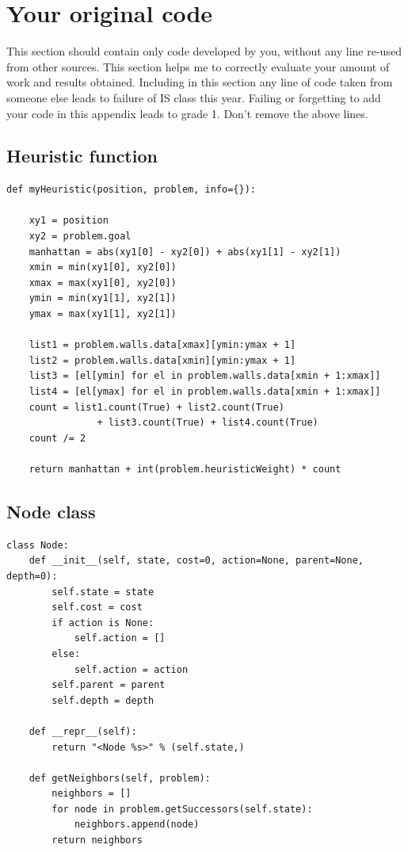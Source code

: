 \documentclass[a4paper,12pt]{report}
\begin{document}
\appendix

\chapter{Your original code}
\label{app:code}
This section should contain only code developed by you, without any line re-used from other sources. 
This section helps me to correctly evaluate your amount of work and results obtained. 
Including in this section any line of code taken from someone else leads to failure of IS class this year.
Failing or forgetting to add your code in this appendix leads to grade 1.
Don't remove the above lines.

\section{Heuristic function}

\begin{Verbatim}[frame=single]
def myHeuristic(position, problem, info={}):

    xy1 = position
    xy2 = problem.goal
    manhattan = abs(xy1[0] - xy2[0]) + abs(xy1[1] - xy2[1])
    xmin = min(xy1[0], xy2[0])
    xmax = max(xy1[0], xy2[0])
    ymin = min(xy1[1], xy2[1])
    ymax = max(xy1[1], xy2[1])

    list1 = problem.walls.data[xmax][ymin:ymax + 1]
    list2 = problem.walls.data[xmin][ymin:ymax + 1]
    list3 = [el[ymin] for el in problem.walls.data[xmin + 1:xmax]]
    list4 = [el[ymax] for el in problem.walls.data[xmin + 1:xmax]]
    count = list1.count(True) + list2.count(True) 
                + list3.count(True) + list4.count(True)
    count /= 2

    return manhattan + int(problem.heuristicWeight) * count
\end{Verbatim}

\section{Node class}

\begin{Verbatim}[frame=single]
class Node:
    def __init__(self, state, cost=0, action=None, parent=None, depth=0):
        self.state = state
        self.cost = cost
        if action is None:
            self.action = []
        else:
            self.action = action
        self.parent = parent
        self.depth = depth

    def __repr__(self):
        return "<Node %s>" % (self.state,)

    def getNeighbors(self, problem):
        neighbors = []
        for node in problem.getSuccessors(self.state):
            neighbors.append(node)
        return neighbors
\end{Verbatim}
\end{document}
